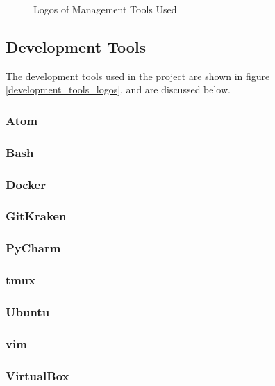 \begin{figure}[ht]
  \caption{Logos of Management Tools Used}
  \label{management_tools_logos}
\end{figure}

\subsection{Development Tools}
The development tools used in the project are shown in figure \ref{development_tools_logos}, and are discussed below.

\subsubsection{Atom \cite{atom}}
\subsubsection{Bash \cite{bash}}
\subsubsection{Docker \cite{docker}}
\subsubsection{GitKraken \cite{gitkraken}}
\subsubsection{PyCharm \cite{pycharm}}
\subsubsection{tmux \cite{tmux}}
\subsubsection{Ubuntu \cite{ubuntu}}
\subsubsection{vim \cite{vim}}
\subsubsection{VirtualBox \cite{virtualbox}}

